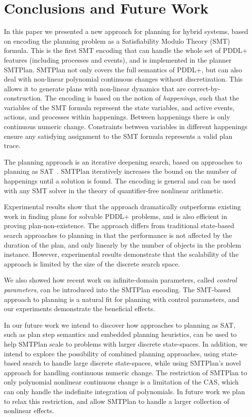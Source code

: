 \section{Conclusions and Future Work}\label{sec:conclusion}

In this paper we presented a new approach for planning for hybrid systems, based on encoding the planning problem as a Satisfiability Modulo Theory (SMT) formula. This is the first SMT encoding that can handle the whole set of PDDL+ features (including processes and events), and is implemented in the planner SMTPlan. SMTPlan not only covers the full semantics of PDDL+, but can also deal with non-linear polynomial continuous changes without discretization. This allows it to generate plans with non-linear dynamics that are correct-by-construction. The encoding is based on the notion of \textit{happenings}, such that the variables of the SMT formula represent the state variables, and active events, actions, and processes within happenings. Between happenings there is only continuous numeric change. Constraints between variables in different happenings ensure any satisfying assignment to the SMT formula represents a valid plan trace.

The planning approach is an iterative deepening search, based on approaches to planning as SAT~\cite{nab02,rin06}. SMTPlan iteratively increases the bound on the number of happenings until a solution is found.
The encoding is general and can be used with any SMT solver in the theory of quantifier-free nonlinear arithmetic.

Experimental results show that the approach dramatically outperforms existing work in finding plans for solvable PDDL+ problems, and is also efficient in proving plan-non-existence. The approach differs from traditional state-based search approaches to planning in that the performance is not affected by the duration of the plan, and only linearly by the number of objects in the problem instance. However, experimental results demonstrate that the scalability of the approach is limited by the size of the discrete search space.

We also showed how recent work on infinite-domain parameters, called \textit{control parameters}, can be introduced into the SMTPlan encoding. The SMT-based approach to planning is a natural fit for planning with control parameters, and our experiments demonstrate the beneficial effects.

In our future work we intend to discover how approaches to planning as SAT, such as plan step semantics and embedded planning heuristics, can be used to help SMTPlan scale to problems with larger discrete state-spaces. In addition, we intend to explore the possibility of combined planning approaches, using state-based search to handle large discrete state-spaces, while using SMTPlan's novel approach for handling continuous numeric change. The restriction of SMTPlan to only polynomial nonlinear continuous change is a limitation of the CAS, which can only handle the indefinite integration of polynomials. In future work we plan to relax this restriction, and allow SMTPlan to handle a larger collection of nonlinear effects.